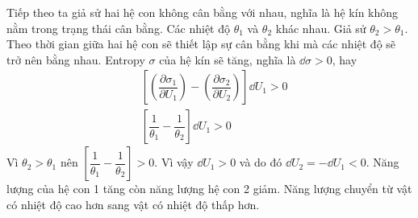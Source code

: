 	Tiếp theo ta giả sử hai hệ con không cân bằng với nhau, nghĩa là hệ kín không nằm trong trạng thái cân bằng. Các nhiệt độ $ \theta_1 $ và $ \theta_2 $ khác nhau. Giả sử $ \theta_2 > \theta_1 $. Theo thời gian giữa hai hệ con sẽ thiết lập sự cân bằng khi mà các nhiệt độ sẽ trở nên bằng nhau. Entropy $ \sigma $ của hệ kín sẽ tăng, nghĩa là $ \dd{\sigma} > 0 $, hay
	\begin{align*}
		& \left[\left(\dfrac{\partial \sigma_1}{\partial U_1}\right) - \left(\dfrac{\partial \sigma_2}{\partial U_2}\right)\right] \dd{U_1} > 0 \\
		& \left[\dfrac{1}{\theta_1} - \dfrac{1}{\theta_2}\right] \dd{U_1} > 0
	\end{align*}
	Vì $ \theta_2 > \theta_1 $ nên $ \left[\dfrac{1}{\theta_1} - \dfrac{1}{\theta_2}\right] > 0 $. Vì vậy $ \dd{U_1} > 0 $ và do đó $ \dd{U_2} = - \dd{U_1} < 0 $. Năng lượng của hệ con 1 tăng còn năng lượng hệ con 2 giảm. Năng lượng chuyển từ vật có nhiệt độ cao hơn sang vật có nhiệt độ thấp hơn.
